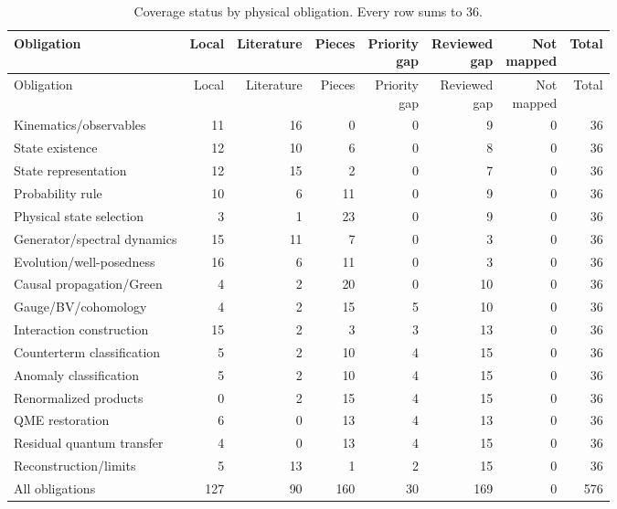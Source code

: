 \begingroup
\scriptsize
\setlength{\tabcolsep}{3pt}
\begin{longtable}{@{}p{}rrrrrrr@{}}
\caption{Coverage status by physical obligation.  Every row sums to 36.}\label{tab:obligation-coverage}\\
\toprule
Obligation & Local & Literature & Pieces & \shortstack{Priority\\gap} & \shortstack{Reviewed\\gap} & \shortstack{Not\\mapped} & Total \\
\midrule
\endfirsthead
\toprule
Obligation & Local & Literature & Pieces & \shortstack{Priority\\gap} & \shortstack{Reviewed\\gap} & \shortstack{Not\\mapped} & Total \\
\midrule
\endhead
Kinematics/observables & 11 & 16 & 0 & 0 & 9 & 0 & 36 \\
State existence & 12 & 10 & 6 & 0 & 8 & 0 & 36 \\
State representation & 12 & 15 & 2 & 0 & 7 & 0 & 36 \\
Probability rule & 10 & 6 & 11 & 0 & 9 & 0 & 36 \\
Physical state selection & 3 & 1 & 23 & 0 & 9 & 0 & 36 \\
Generator/spectral dynamics & 15 & 11 & 7 & 0 & 3 & 0 & 36 \\
Evolution/well-posedness & 16 & 6 & 11 & 0 & 3 & 0 & 36 \\
Causal propagation/Green & 4 & 2 & 20 & 0 & 10 & 0 & 36 \\
Gauge/BV/cohomology & 4 & 2 & 15 & 5 & 10 & 0 & 36 \\
Interaction construction & 15 & 2 & 3 & 3 & 13 & 0 & 36 \\
Counterterm classification & 5 & 2 & 10 & 4 & 15 & 0 & 36 \\
Anomaly classification & 5 & 2 & 10 & 4 & 15 & 0 & 36 \\
Renormalized products & 0 & 2 & 15 & 4 & 15 & 0 & 36 \\
QME restoration & 6 & 0 & 13 & 4 & 13 & 0 & 36 \\
Residual quantum transfer & 4 & 0 & 13 & 4 & 15 & 0 & 36 \\
Reconstruction/limits & 5 & 13 & 1 & 2 & 15 & 0 & 36 \\
\midrule
All obligations & 127 & 90 & 160 & 30 & 169 & 0 & 576 \\
\bottomrule
\end{longtable}
\endgroup

